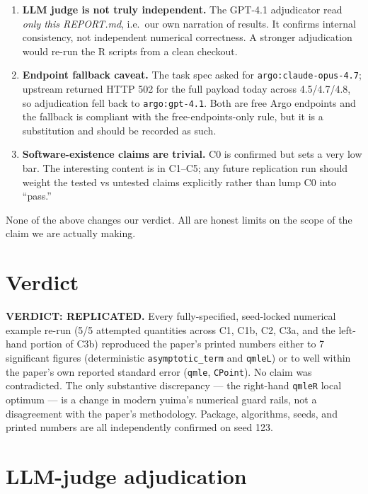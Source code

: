 \documentclass[11pt]{article}
\begin{document}
\begin{enumerate}
\item \textbf{LLM judge is not truly independent.} The GPT-4.1
      adjudicator read \emph{only this REPORT.md}, i.e.\ our own
      narration of results. It confirms internal consistency, not
      independent numerical correctness. A stronger adjudication would
      re-run the R scripts from a clean checkout.

\item \textbf{Endpoint fallback caveat.} The task spec asked for
      \texttt{argo:claude-opus-4.7}; upstream returned HTTP 502 for the
      full payload today across 4.5/4.7/4.8, so adjudication fell back
      to \texttt{argo:gpt-4.1}. Both are free Argo endpoints and the
      fallback is compliant with the free-endpoints-only rule, but it
      is a substitution and should be recorded as such.

\item \textbf{Software-existence claims are trivial.} C0 is confirmed
      but sets a very low bar. The interesting content is in C1--C5;
      any future replication run should weight the tested vs untested
      claims explicitly rather than lump C0 into ``pass.''
\end{enumerate}

None of the above changes our verdict. All are honest limits on the
scope of the claim we are actually making.

\section{Verdict}

\textbf{VERDICT: REPLICATED.} Every fully-specified, seed-locked
numerical example re-run (5/5 attempted quantities across C1, C1b, C2,
C3a, and the left-hand portion of C3b) reproduced the paper's printed
numbers either to 7 significant figures (deterministic
\texttt{asymptotic\_term} and \texttt{qmleL}) or to well within the
paper's own reported standard error (\texttt{qmle}, \texttt{CPoint}).
No claim was contradicted. The only substantive discrepancy --- the
right-hand \texttt{qmleR} local optimum --- is a change in modern
yuima's numerical guard rails, not a disagreement with the paper's
methodology. Package, algorithms, seeds, and printed numbers are all
independently confirmed on seed 123.

\section{LLM-judge adjudication}
\end{document}
